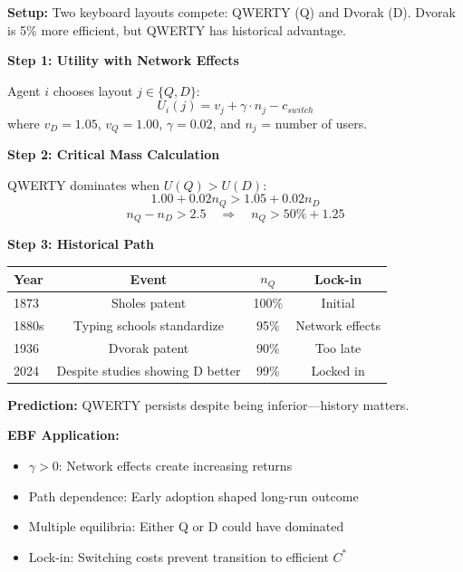\begin{tcolorbox}[colback=orange!5!white, colframe=orange!75!black,
    title=\textbf{Worked Example: QWERTY Lock-In}]

\textbf{Setup:} Two keyboard layouts compete: QWERTY (Q) and Dvorak (D).
Dvorak is 5\% more efficient, but QWERTY has historical advantage.

\textbf{Step 1: Utility with Network Effects}

Agent $i$ chooses layout $j \in \{Q, D\}$:
\[
U_i(j) = v_j + \gamma \cdot n_j - c_{switch}
\]
where $v_D = 1.05$, $v_Q = 1.00$, $\gamma = 0.02$, and $n_j$ = number of users.

\textbf{Step 2: Critical Mass Calculation}

QWERTY dominates when $U(Q) > U(D)$:
\[
1.00 + 0.02 n_Q > 1.05 + 0.02 n_D
\]
\[
n_Q - n_D > 2.5 \quad \Rightarrow \quad n_Q > 50\% + 1.25
\]

\textbf{Step 3: Historical Path}

\begin{center}
\renewcommand{\arraystretch}{1.2}
\begin{tabular}{@{}lccc@{}}
\toprule
\textbf{Year} & \textbf{Event} & $n_Q$ & \textbf{Lock-in} \\
\midrule
1873 & Sholes patent & 100\% & Initial \\
1880s & Typing schools standardize & 95\% & Network effects \\
1936 & Dvorak patent & 90\% & Too late \\
2024 & Despite studies showing D better & 99\% & Locked in \\
\bottomrule
\end{tabular}
\end{center}

\textbf{Prediction:} QWERTY persists despite being inferior---history matters.

\textbf{EBF Application:}
\begin{itemize}[nosep]
    \item $\gamma > 0$: Network effects create increasing returns
    \item Path dependence: Early adoption shaped long-run outcome
    \item Multiple equilibria: Either Q or D could have dominated
    \item Lock-in: Switching costs prevent transition to efficient $C^*$
\end{itemize}

\end{tcolorbox}

